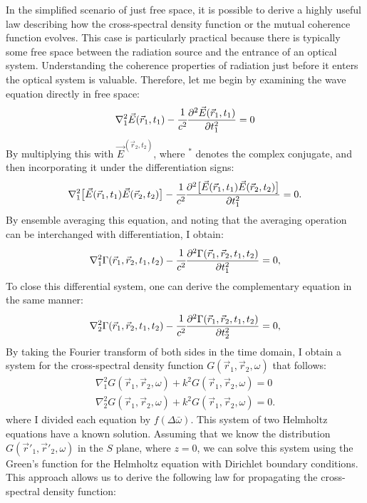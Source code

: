     In the simplified scenario of just free space, it is possible to derive a highly useful law describing how the cross-spectral density function or the mutual coherence function evolves. This case is particularly practical because there is typically some free space between the radiation source and the entrance of an optical system. Understanding the coherence properties of radiation just before it enters the optical system is valuable. Therefore, let me begin by examining the wave equation directly in free space:
    \begin{align}
        \nabla^2_1 \vec{E}(\vec{r}_1, t_1) - \cfrac{1}{c^2} \frac{\partial^2 \vec{E}(\vec{r}_1, t_1)}{\partial t_1^2} = 0
        \label{Eq:wave_eq}
    \end{align}
    By multiplying this with $\vec{E}^(\vec{r}_2, t_2)$, where $^*$ denotes the complex conjugate, and then incorporating it under the differentiation signs:
    \begin{align}
        \nabla^2_1 \big[\vec{E}(\vec{r}_1, t_1) \vec{E}(\vec{r}_2, t_2)\big]- \cfrac{1}{c^2} \frac{\partial^2 \big[\vec{E}(\vec{r}_1, t_1) \vec{E}(\vec{r}_2, t_2)\big]}{\partial t_1^2} = 0.
    \end{align}
    By ensemble averaging this equation, and noting that the averaging operation can be interchanged with differentiation, I obtain:
    \begin{align}
        \nabla^2_1 \Gamma(\vec{r}_1, \vec{r}_2, t_1, t_2)  - \cfrac{1}{c^2} \frac{\partial^2 \Gamma(\vec{r}_1, \vec{r}_2, t_1, t_2)}{\partial t_1^2} = 0,
    \end{align}
    To close this differential system, one can derive the complementary equation in the same manner:
    \begin{align}
        \nabla^2_2 \Gamma(\vec{r}_1, \vec{r}_2, t_1, t_2)  - \cfrac{1}{c^2} \frac{\partial^2 \Gamma(\vec{r}_1, \vec{r}_2, t_1, t_2)}{\partial t_2^2} = 0,
    \end{align}
    By taking the Fourier transform of both sides in the time domain, I obtain a system for the cross-spectral density function $G(\vec{r}_1, \vec{r}_2, \omega)$ that follows:
    \begin{align}
        \nabla^2_1 G(\vec{r}_1, \vec{r}_2, \omega) + k^2 G(\vec{r}_1, \vec{r}_2, \omega) = 0\\
        \nabla^2_2 G(\vec{r}_1, \vec{r}_2, \omega) + k^2 G(\vec{r}_1, \vec{r}_2, \omega) =0 .
    \end{align}
    where I divided each equation by $f(\Delta \bar{\omega})$. This system of two Helmholtz equations have a known solution. Assuming that we know the distribution $G(\vec{r}'_1, \vec{r}'_2, \omega)$ in the $S$ plane, where $z=0$, we can solve this system using the Green's function for the Helmholtz equation with Dirichlet boundary conditions. This approach allows us to derive the following law for propagating the cross-spectral density function:

